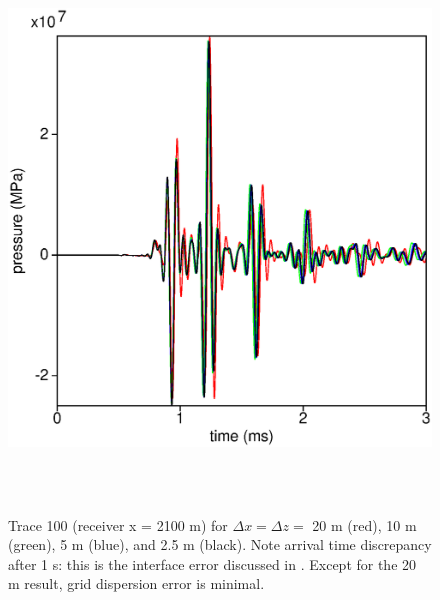\documentclass [12pt]{georeport}
\begin{document}
\begin{figure}
\label{fig4}
\includegraphics[height=15cm,width=15cm]{./Fig/fig4.ps}
\caption{Trace 100 (receiver x = 2100 m) for $\Delta x = \Delta z = $
  20 m (red), 10 m (green), 5 m (blue), and 2.5 m (black). Note
  arrival time discrepancy after 1 s: this is the interface error
  discussed in \cite{SymesVdovina:09}. Except for the 20 m result,
  grid dispersion error is minimal.} 
\end{figure}
\end{document}
